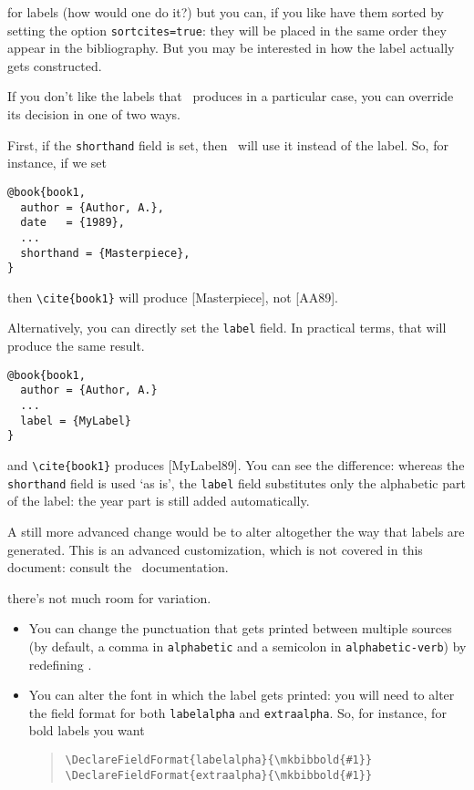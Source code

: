  for labels (how
would one do it?) but you can, if you like have them sorted by setting
the option \verb|sortcites=true|: they will be placed in the same
order they appear in the bibliography. But you may be interested in
how the label actually gets constructed.

If you don't like the labels that \biblatex\ produces in a particular
case, you can override its decision in one of two ways.

First, if the \verb|shorthand| field is set, then \biblatex\ will use
it instead of the label. So, for instance, if we set
\begin{verbatim}
@book{book1,
  author = {Author, A.},
  date   = {1989},
  ...
  shorthand = {Masterpiece},
}
\end{verbatim}
then \verb|\cite{book1}| will produce [Masterpiece], not [AA89].

Alternatively, you can directly set the \verb|label| field. In
practical terms, that will produce the same result.
\begin{verbatim}
@book{book1,
  author = {Author, A.} 
  ...
  label = {MyLabel}
}
\end{verbatim}
and \verb|\cite{book1}| produces [MyLabel89]. You can see the difference:
whereas the \verb|shorthand| field is used `as is', the \verb|label|
field substitutes only the alphabetic part of the label: the year part
is still added automatically.

A still more advanced change would be to alter altogether the way that
labels are generated. This is an advanced customization, which is not
covered in this document: consult the \biblatex\ documentation.

 there's not much room for
variation.
\begin{itemize}
\item You can change the punctuation that gets printed between
multiple sources (by default, a comma in \verb|alphabetic| and a
semicolon in \verb|alphabetic-verb|) by redefining
.
\item You can alter the font in which the label gets printed: you will
  need to alter the field format for both \verb|labelalpha| and
  \verb|extraalpha|. So, for instance, for bold labels you want
\begin{quote}
\verb|\DeclareFieldFormat{labelalpha}{\mkbibbold{#1}}|\\
\verb|\DeclareFieldFormat{extraalpha}{\mkbibbold{#1}}|
\end{quote}
\end{itemize}

